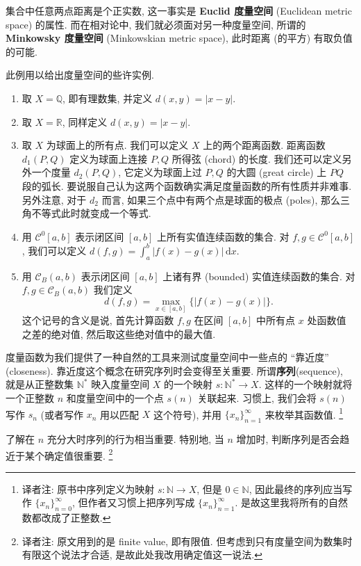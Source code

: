 \documentclass[lang=cn,zihao=-4,twoside,fontset=none]{textbook}
\makeatletter
\newcommand{\addterm}[2]{\textbf{#1}{(#2)}\index[nidx]{#1@\textbf{#1}(#2)}}
\makeatother
\begin{document}
集合中任意两点距离是个正实数, 这一事实是 \textbf{Euclid 度量空间} (Euclidean metric space) 的属性. 而在相对论中, 我们就必须面对另一种度量空间, 所谓的 \textbf{Minkowsky 度量空间} (Minkowskian metric space), 此时距离 (的平方) 有取负值的可能. 

\begin{exam}\label{eg:1.3.2}
    此例用以给出度量空间的些许实例.
    \begin{enumerate}[label=\textnormal{(\alph*)}]
        \item 取 $X=\mathbb Q$, 即有理数集, 并定义 $d(x,y)=|x-y|$.
        \item 取 $X=\mathbb R$, 同样定义 $d(x,y)=|x-y|$.
        \item 取 $X$ 为球面上的所有点. 我们可以定义 $X$ 上的两个距离函数. 距离函数 $d_1(P,Q)$ 定义为球面上连接 $P,Q$ 所得弦 (chord) 的长度.  我们还可以定义另外一个度量 $d_2(P,Q)$, 它定义为球面上过 $P,Q$ 的大圆 (great circle) 上 $PQ$ 段的弧长. 要说服自己认为这两个函数确实满足度量函数的所有性质并非难事. 另外注意, 对于 $d_2$ 而言, 如果三个点中有两个点是球面的极点 (poles), 那么三角不等式此时就变成一个等式. 
        \item 用 $\mathcal C^0[a,b]$ 表示闭区间 $[a,b]$ 上所有实值连续函数的集合. 对 $f,g\in\mathcal C^0[a,b]$, 我们可以定义 $d(f,g)=\int_a^b|f(x)-g(x)|\,\mathrm{d}x$. 
        \item 用 $\mathcal C_B(a,b)$ 表示闭区间 $[a,b]$ 上诸有界 (bounded) 实值连续函数的集合. 对 $f,g\in\mathcal C_B (a,b)$ 我们定义
        $$
        d(f,g)=\max_{x\in[a,b]}\{|f(x)-g(x)|\}.
        $$
        这个记号的含义是说, 首先计算函数 $f,g$ 在区间 $[a,b]$ 中所有点 $x$ 处函数值之差的绝对值, 然后取这些绝对值中的最大值.

    \end{enumerate}
\end{exam}


度量函数为我们提供了一种自然的工具来测试度量空间中一些点的 “靠近度” (closeness). 靠近度这个概念在研究序列时会变得至关重要. 所谓\addterm{序列}{sequence}, 就是从正整数集 $\mathbb N^*$ 映入度量空间 $X$ 的一个映射 $s:\mathbb N^*\to X$. 这样的一个映射就将一个正整数 $n$ 和度量空间中的一个点 $s(n)$ 关联起来.  习惯上, 我们会将 $s(n)$ 写作 $s_n$ (或者写作 $x_n$ 用以匹配 $X$ 这个符号), 并用 $\{x_n\}_{n=1}^\infty$ 来枚举其函数值. \footnote{译者注: 原书中序列定义为映射 $s:\mathbb N\to X$, 但是 $0\in\mathbb N$, 因此最终的序列应当写作 $\{x_n\}_{n=0}^\infty$, 但作者又习惯上把序列写成 $\{x_n\}_{n=1}^\infty$. 是故这里我将所有的自然数都改成了正整数.}

了解在 $n$ 充分大时序列的行为相当重要. 特别地, 当 $n$ 增加时, 判断序列是否会趋近于某个确定值很重要. \footnote{译者注: 原文用到的是 finite value, 即有限值. 但考虑到只有度量空间为数集时有限这个说法才合适, 是故此处我改用确定值这一说法.}
\end{document}
